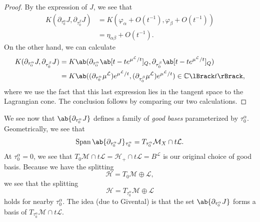 \documentclass{amsart}
\theoremstyle{definition}
\theoremstyle{remark}
\theoremstyle{plain}
\theoremstyle{definition}
\theoremstyle{remark}
\newcommand{\C}{\mathbb{C}}
\newcommand{\mc}[1]{\mathcal{#1}}
\newcommand{\on}[1]{\operatorname{#1}}
\newcommand{\1}{\mathbf{1}}
\newcommand{\2}{\mathbf{2}}
\newcommand{\3}{\mathbf{3}}
\newcommand{\ps}[1]{\lBrack #1 \rBrack}
\begin{document}
\begin{proof}
    By the expression of \(J\), we see that
    \begin{align*}
        K(\partial_{\tau_0^{\alpha}} J, \partial_{\tau_0^{\beta}} J) &= K (\varphi_{\alpha} + O(t^{-1}), \varphi_{\beta} + O(t^{-1})) \\
        &= \eta_{\alpha \beta} + O(t^{-1}).
    \end{align*}
    On the other hand, we can calculate
    \begin{align*}
        K(\partial_{\tau_0^{\alpha}} J, \partial_{\tau_0^{\beta}} J) &= K \ab( \partial_{\tau_0^{\alpha}}\ab[t - t e^{\mu^{\mc{L}}/t}]_Q, \partial_{\tau_0^{\beta}}\ab[t - t e^{\mu^{\mc{L}}/t}]_Q ) \\
        &= K \ab( (\partial_{\tau_0^{\alpha}} \mu^{\mc{L}}) e^{\mu^{\mc{L}}/t}, (\partial_{\tau_0^{\beta}} \mu^{\mc{L}}) e^{\mu^{\mc{L}}/t} ) \in \C\ps{t},
    \end{align*}
    where we use the fact that this last expression lies in the tangent space to the Lagrangian cone. The conclusion follows by comparing our two calculations.
\end{proof}

We see now that \(\ab\{ \partial_{\tau_0^{\alpha}} J\}\) defines a family of \textit{good bases} parameterized by \(\tau_0^{\alpha}\). Geometrically, we see that
\[ \on{Span} \ab\{ \partial_{\tau_0^{\alpha}} J \}_{\tau_0^{\alpha}} = T_{\tau_0^{\alpha}} \mc{M}_X \cap t \mc{L}. \]
At \(\tau_0^{\alpha} = 0\), we see that \(T_0 \mc{M} \cap t \mc{L} = \mc{H}_+ \cap t \mc{L} = B^{\mc{L}}\) is our original choice of good basis. Because we have the splitting
\[ \mc{H} = T_0 \mc{M} \oplus \mc{L}, \]
we see that the splitting
\[ \mc{H} = T_{\tau_0^{\alpha}} \mc{M} \oplus \mc{L} \]
holds for nearby \(\tau_0^{\alpha}\). The idea (due to Givental) is that the set \(\ab\{ \partial_{\tau_0^{\alpha}} J\}\) forms a basis of \(T_{\tau_0^{\alpha}} \mc{M} \cap t \mc{L}\).
\end{document}
